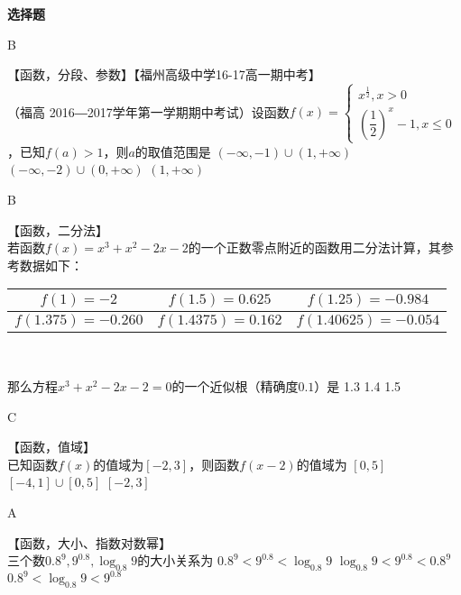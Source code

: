 \begin{exercise}{\bf 选择题}
\begin{answer}
        B
      \end{answer}
    \item 【函数，分段、参数】【福州高级中学16-17高一期中考】\\
      （福高 2016―2017学年第一学期期中考试）设函数$\displaystyle f(x)=\begin{cases}x^{\frac12},x>0\\(\dfrac12)^x-1,x\leq0\end{cases} $，已知$f(a)>1$，则$a$的取值范围是\xz
       {$(-\infty,-1)\cup(1,+\infty)$}
       {$(-\infty,-2)\cup(0,+\infty)$}
       {$(1,+\infty)$}
      \begin{answer}
        B
      \end{answer}
    \item 【函数，二分法】\\
      若函数$f(x)=x^3+x^2-2x-2$的一个正数零点附近的函数用二分法计算，其参考数据如下：\\
      \begin{center}
        \renewcommand{\arraystretch}{1.4}
        \begin{tabular}{|c|c|c|}
          \hline
          $f(1)=-2$&$f(1.5)=0.625$&$f(1.25)=-0.984$\\
          \hline
          $f(1.375)=-0.260$&$f(1.4375)=0.162$&$f(1.40625)=-0.054$\\
          \hline
        \end{tabular}\\
      \end{center}
      那么方程$x^3+x^2-2x-2=0$的一个近似根（精确度$0.1$）是\xz
        {1.3}
        {1.4}
        {1.5}
      \begin{answer}
        C
      \end{answer}
    \item 【函数，值域】\\
      已知函数$f(x)$的值域为$[-2,3]$，则函数$f(x-2)$的值域为\xz
        \xx{$[-4,1]$}
        {$[0,5]$}
        {{$[-4,1]\cup[0,5]$}}
        {$[-2,3]$}
      \begin{answer}
        A
      \end{answer}
    \item 【函数，大小、指数对数幂】\\
      三个数$0.8^9,9^{0.8},\log_{0.8}9$的大小关系为\xz
        {$0.8^9<9^{0.8}<\log_{0.8}9$}
        {$\log_{0.8}9<9^{0.8}<0.8^9$}
        {$0.8^9<\log_{0.8}9<9^{0.8}$}
      \begin{answer}

\end{answer}
\end{exercise}
